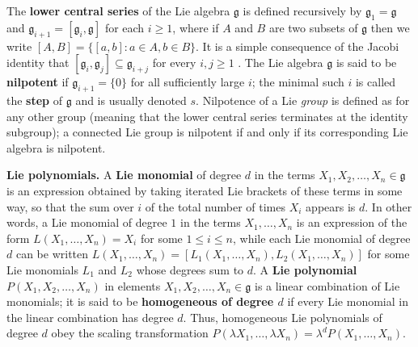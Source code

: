 \documentclass[11pt]{article}
\numberwithin{equation}{section}
\theoremstyle{plain}
\theoremstyle{definition}
\theoremstyle{remark}
\numberwithin{equation}{section}
\numberwithin{equation}{section}
\begin{document}
\medskip


The \textbf{lower central series} of the Lie algebra $\mathfrak{g}$ is defined recursively by $\mathfrak{g}_1=\mathfrak{g}$ and $\mathfrak{g}_{i+1}=[\mathfrak{g}_i,\mathfrak{g}]$ for each $i\geq 1$, where if $A$ and $B$ are two subsets of $\mathfrak{g}$ then we write $[A,B]=\{[a,b]:a\in A,b\in B\}$. It is a simple consequence of the Jacobi identity that $[\mathfrak{g}_i,\mathfrak{g}_j] \subseteq \mathfrak{g}_{i+j}$ for every $i,j \geq 1$ \cite[Lemma 1.4.3]{Wang2023}. The Lie algebra $\mathfrak{g}$ is said to be \textbf{nilpotent} if $\mathfrak{g}_{i+1}=\{0\}$ for all sufficiently large $i$; the minimal such $i$ is called the \textbf{step} of $\mathfrak{g}$ and is usually denoted $s$. Nilpotence of a Lie \emph{group} is defined as for any other group (meaning that the lower central series terminates at the identity subgroup); a connected Lie group is nilpotent if and only if its corresponding Lie algebra is nilpotent.


\medskip

\textbf{Lie polynomials.} 
A \textbf{Lie monomial} of degree $d$ in the terms $X_1, X_2, \ldots, X_n \in \mathfrak{g}$ is an expression obtained by taking iterated Lie brackets of these terms in some way, so that the sum over $i$ of the total number of times $X_i$ appears is $d$. In other words, a Lie monomial of degree $1$ in the terms $X_1,\ldots,X_n$ is an expression of the form $L(X_1,\ldots,X_n)=X_i$ for some $1\leq i \leq n$, while each Lie monomial of degree $d$ can be written $L(X_1,\ldots,X_n)=[L_1(X_1,\ldots,X_n),L_2(X_1,\ldots,X_n)]$ for some Lie monomials $L_1$ and $L_2$ whose degrees sum to $d$. 
A \textbf{Lie polynomial} $P(X_1, X_2, \ldots, X_n)$ in elements $X_1, X_2, \ldots, X_n \in \mathfrak{g}$ is a linear combination of Lie monomials; it is said to be \textbf{homogeneous of degree $d$} if every Lie monomial in the linear combination has degree $d$. Thus, homogeneous Lie polynomials of degree $d$ obey the scaling transformation $P(\lambda X_1,\ldots, \lambda X_n)=\lambda^d P(X_1,\ldots, X_n)$. 

\medskip
\end{document}
